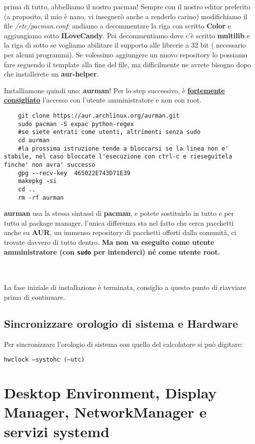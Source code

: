 \documentclass[twoside,italian]{book}
\newcommand{\code}[1]{\texttt{#1}}
\newcommand{\centcode}[1]{

\definecolor{codice}{rgb}{0.5,0.1,0.1}

	\begin{center}
		\color{codice}
		\code{#1}
	\end{center}


}
\newcommand{\nlinea}{
	\leavevmode
	\\
}
\begin{document}
			prima di tutto, abbelliamo il nostro pacman!
			Sempre con il nostro editor preferito (a proposito, il mio è nano, vi insegnerò anche a renderlo carino) modifichiamo il file \textit{/etc/pacman.conf}: andiamo a decommentare la riga con scritto \textbf{Color} e aggiungiamo sotto \textbf{ILoveCandy}.
			Poi decommentiamo dove c'è scritto \textbf{multilib} e la riga di sotto se vogliamo abilitare il supporto alle librerie a 32 bit ( necessario per alcuni programmi).
			Se volessimo aggiungere un nuovo repository lo possiamo fare seguendo il template alla fine del file, ma difficilmente ne avrete bisogno dopo che installerete un \textbf{aur-helper}.

			Installiamone quindi uno: \textbf{aurman}!
			Per lo step successivo, è \underline{\textbf{fortemente consigliato}} l'accesso con l'utente amministratore e non con root.

\begin{lstlisting}
	git clone https://aur.archlinux.org/aurman.git
	sudo pacman -S expac python-regex
	#se siete entrati come utenti, altrimenti senza sudo
	cd aurman
	#la prossima istruzione tende a bloccarsi se la linea non e' stabile, nel caso bloccate l'esecuzione con ctrl-c e rieseguitela finche' non avra' successo
	gpg --recv-key  465022E743D71E39
	makepkg -si
	cd ..
	rm -rf aurman
\end{lstlisting}

			\textbf{aurman} usa la stessa sintassi di \textbf{pacman}, e potete sostituirlo in tutto e per tutto al package manager, l'unica differenza sta nel fatto che cerca pacchetti anche su \textbf{AUR}, un immenso repository di pacchetti offerti dalla comunità, ci trovate davvero di tutto dentro. \textbf{Ma non va eseguito come utente amministratore (con \code{sudo} per intenderci) né come utente root.}
\nlinea
	\nlinea
			La fase iniziale di installazione è terminata, consiglio a questo punto di riavviare prima di continuare.
			
			
		\section{Sincronizzare orologio di sistema e Hardware}
			
			Per sincronizzare l'orologio di sistema con quello del calcolatore si può digitare:\centcode{hwclock --systohc (--utc)}

	\chapter{Desktop Environment, Display Manager, NetworkManager e servizi systemd}
\end{document}
